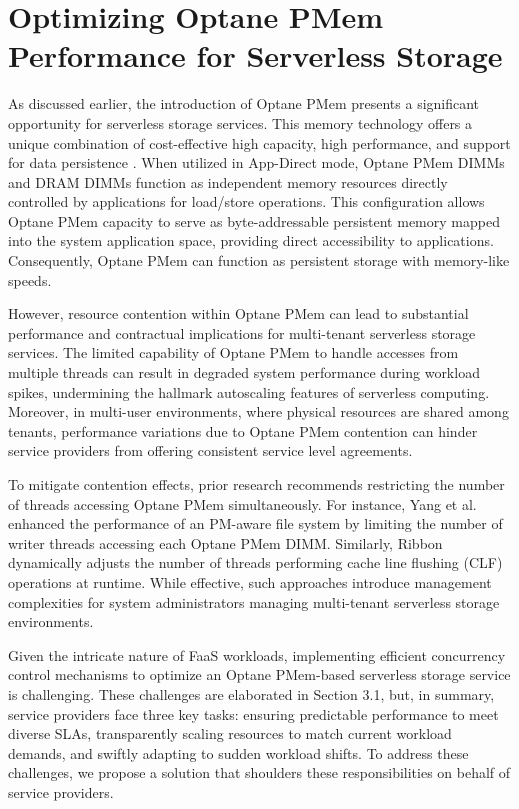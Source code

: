 \chapter[Optimizing Optane PMem Performance for Serverless Storage]{Optimizing Optane PMem Performance for Serverless Storage}

As discussed earlier, the introduction of Optane PMem presents a significant opportunity for serverless storage services. This memory technology offers a unique combination of cost-effective high capacity, high performance, and support for data persistence \cite{IntelOp15:online}. When utilized in App-Direct mode, Optane PMem DIMMs and DRAM DIMMs function as independent memory resources directly controlled by applications for load/store operations. This configuration allows Optane PMem capacity to serve as byte-addressable persistent memory mapped into the system application space, providing direct accessibility to applications. Consequently, Optane PMem can function as persistent storage with memory-like speeds.

However, resource contention within Optane PMem can lead to substantial performance and contractual implications for multi-tenant serverless storage services. The limited capability of Optane PMem to handle accesses from multiple threads can result in degraded system performance during workload spikes, undermining the hallmark autoscaling features of serverless computing. Moreover, in multi-user environments, where physical resources are shared among tenants, performance variations due to Optane PMem contention can hinder service providers from offering consistent service level agreements.

To mitigate contention effects, prior research recommends restricting the number of threads accessing Optane PMem simultaneously. For instance, Yang et al. \cite{yang2020empirical} enhanced the performance of an PM-aware file system by limiting the number of writer threads accessing each Optane PMem DIMM. Similarly, Ribbon \cite{wu2020ribbon} dynamically adjusts the number of threads performing cache line flushing (CLF) operations at runtime. While effective, such approaches introduce management complexities for system administrators managing multi-tenant serverless storage environments.

Given the intricate nature of FaaS workloads, implementing efficient concurrency control mechanisms to optimize an Optane PMem-based serverless storage service is challenging. These challenges are elaborated in Section 3.1, but, in summary, service providers face three key tasks: ensuring predictable performance to meet diverse SLAs, transparently scaling resources to match current workload demands, and swiftly adapting to sudden workload shifts. To address these challenges, we propose a solution that shoulders these responsibilities on behalf of service providers.

